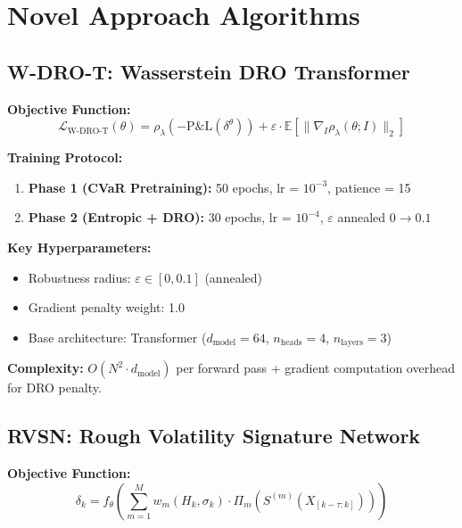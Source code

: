 \section{Novel Approach Algorithms}
\label{app:novel_algorithms}

\subsection{W-DRO-T: Wasserstein DRO Transformer}

\textbf{Objective Function:}
\begin{equation}
    \mathcal{L}_{\text{W-DRO-T}}(\theta) = \rho_\lambda(-\text{P\&L}(\delta^\theta)) + \varepsilon \cdot \mathbb{E}\left[\|\nabla_I \rho_\lambda(\theta; I)\|_2\right]
\end{equation}

\textbf{Training Protocol:}
\begin{enumerate}[noitemsep]
    \item \textbf{Phase 1 (CVaR Pretraining):} 50 epochs, lr = $10^{-3}$, patience = 15
    \item \textbf{Phase 2 (Entropic + DRO):} 30 epochs, lr = $10^{-4}$, $\varepsilon$ annealed $0 \to 0.1$
\end{enumerate}

\textbf{Key Hyperparameters:}
\begin{itemize}[noitemsep]
    \item Robustness radius: $\varepsilon \in [0, 0.1]$ (annealed)
    \item Gradient penalty weight: 1.0
    \item Base architecture: Transformer ($d_{\text{model}}=64$, $n_{\text{heads}}=4$, $n_{\text{layers}}=3$)
\end{itemize}

\textbf{Complexity:} $O(N^2 \cdot d_{\text{model}})$ per forward pass + gradient computation overhead for DRO penalty.

\subsection{RVSN: Rough Volatility Signature Network}

\textbf{Objective Function:}
\begin{equation}
    \delta_k = f_\theta\left(\sum_{m=1}^{M} w_m(H_k, \sigma_k) \cdot \Pi_m\left(S^{(m)}(X_{[k-\tau:k]})\right)\right)
\end{equation}

